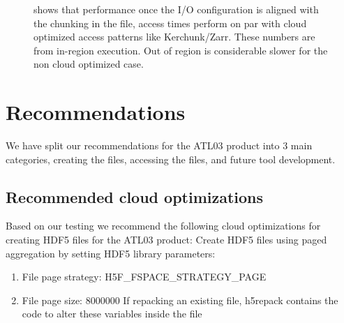 \documentclass[
]{agujournal2019}
\providecommand{\tightlist}{%
  \setlength{\itemsep}{0pt}\setlength{\parskip}{0pt}}\usepackage{longtable,booktabs,array}
\begin{document}
\begin{figure}


\caption{\label{fig-5}shows that performance once the I/O configuration
is aligned with the chunking in the file, access times perform on par
with cloud optimized access patterns like Kerchunk/Zarr. These numbers
are from in-region execution. Out of region is considerable slower for
the non cloud optimized case.}

\end{figure}%

\section{Recommendations}\label{recommendations}

We have split our recommendations for the ATL03 product into 3 main
categories, creating the files, accessing the files, and future tool
development.

\subsection{Recommended cloud
optimizations}\label{recommended-cloud-optimizations}

Based on our testing we recommend the following cloud optimizations for
creating HDF5 files for the ATL03 product: Create HDF5 files using paged
aggregation by setting HDF5 library parameters:

\begin{enumerate}
\def\labelenumi{\arabic{enumi}.}
\tightlist
\item
  File page strategy: H5F\_FSPACE\_STRATEGY\_PAGE
\item
  File page size: 8000000 If repacking an existing file, h5repack
  contains the code to alter these variables inside the file
\end{enumerate}
\end{document}
